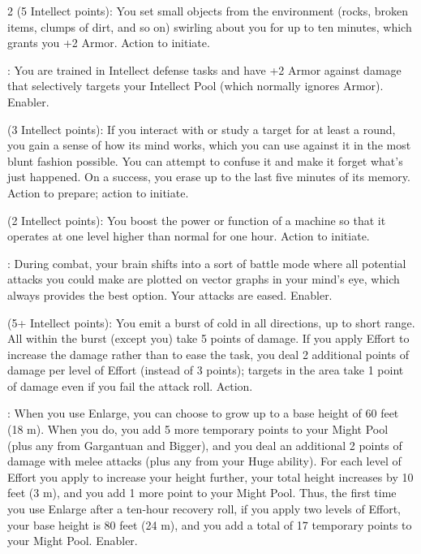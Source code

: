 \begin{multicols}{2}
 (5 Intellect points): You set small objects from the environment (rocks, broken items, clumps of dirt, and so on) swirling about you for up to ten minutes, which grants you +2 Armor. Action to initiate. 

: You are trained in Intellect defense tasks and have +2 Armor against damage that selectively targets your Intellect Pool (which normally ignores Armor). Enabler. 

 (3 Intellect points): If you interact with or study a target for at least a round, you gain a sense of how its mind works, which you can use against it in the most blunt fashion possible. You can attempt to confuse it and make it forget what’s just happened. On a success, you erase up to the last five minutes of its memory. Action to prepare; action to initiate. 

 (2 Intellect points): You boost the power or function of a machine so that it operates at one level higher than normal for one hour. Action to initiate. 

: During combat, your brain shifts into a sort of battle mode where all potential attacks you could make are plotted on vector graphs in your mind’s eye, which always provides the best option. Your attacks are eased. Enabler. 

 (5+ Intellect points): You emit a burst of cold in all directions, up to short range. All within the burst (except you) take 5 points of damage. If you apply Effort to increase the damage rather than to ease the task, you deal 2 additional points of damage per level of Effort (instead of 3 points); targets in the area take 1 point of damage even if you fail the attack roll. Action. 

: When you use Enlarge, you can choose to grow up to a base height of 60 feet (18 m). When you do, you add 5 more temporary points to your Might Pool (plus any from Gargantuan and Bigger), and you deal an additional 2 points of damage with melee attacks (plus any from your Huge ability). For each level of Effort you apply to increase your height further, your total height increases by 10 feet (3 m), and you add 1 more point to your Might Pool. Thus, the first time you use Enlarge after a ten-hour recovery roll, if you apply two levels of Effort, your base height is 80 feet (24 m), and you add a total of 17 temporary points to your Might Pool. Enabler. 


\end{multicols}
